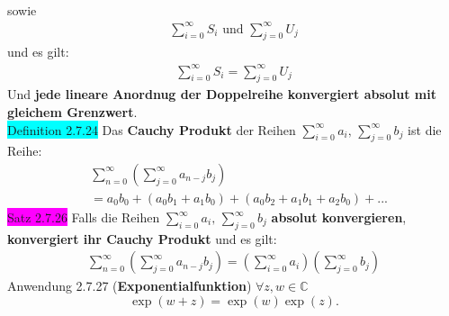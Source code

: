 \documentclass[landscape, 10pt]{article}
\newcommand{\C}{\mathbb{C}}
\begin{document}
\begin{multicols}{3}
\begin{align*}
                     \end{align*}
                     sowie 
                     \begin{align*}
                            \sum_{i=0}^\infty S_i
                            \text{ und }
                            \sum_{j=0}^\infty U_j
                     \end{align*}
                     und es gilt:
                     \begin{align*}
                            \sum_{i=0}^\infty S_i
                            =\sum_{j=0}^\infty U_j
                     \end{align*}
                     Und \textbf{jede lineare Anordnug 
                     der Doppelreihe konvergiert 
                     absolut mit gleichem Grenzwert}.\\
              \colorbox{cyan}{Definition 2.7.24} 
                     Das \textbf{Cauchy Produkt} der Reihen 
                     \textcolor{NavyBlue}{
                     $\sum_{i=0}^\infty a_i,\,\sum_{j=0}^\infty b_j$} 
                     ist die Reihe: 
                     \begin{align*}
                            &\sum_{n=0}^\infty
                            (\sum_{j=0}^\infty a_{n-j}b_j)\\
                            &=a_0b_0+(a_0b_1+a_1b_0)
                            +(a_0b_2+a_1b_1+a_2b_0)+...
                     \end{align*}
              \colorbox{magenta}{Satz 2.7.26} Falls die Reihen 
                     \textcolor{NavyBlue}{
                     $\sum_{i=0}^\infty a_i,\,\sum_{j=0}^\infty b_j$}
                     \textbf{absolut konvergieren}, 
                     \textbf{konvergiert ihr Cauchy Produkt}
                     und es gilt: 
                     \begin{align*}
                            \sum_{n=0}^\infty
                            (\sum_{j=0}^\infty a_{n-j}b_j)
                            =(\sum_{i=0}^\infty a_i)
                            (\sum_{j=0}^\infty b_j)
                     \end{align*}
              \colorbox{Dandelion}{Anwendung 2.7.27} 
              (\textbf{Exponentialfunktion})
                     \textcolor{NavyBlue}{
                     $\forall z,w\in\C$}
                     \begin{equation*}
                            \exp(w+z)=\exp(w)\exp(z).                            
                     \end{equation*}

\end{multicols}
\end{document}
